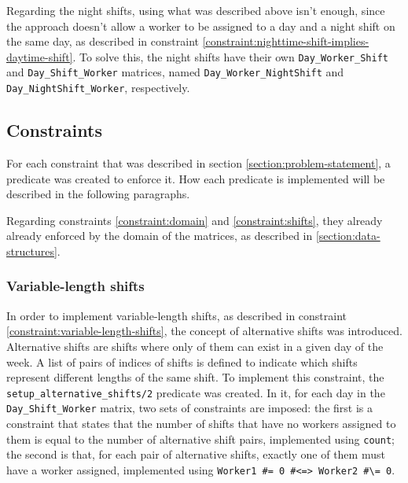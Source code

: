 \documentclass[conference]{IEEEtran}
\def\constraint#1{\vspace{4pt} {#1}}
\begin{document}
Regarding the night shifts, using what was described above isn't enough, since the approach doesn't allow a worker to be assigned to a day and a night shift on the same day, as described in constraint \ref{constraint:nighttime-shift-implies-daytime-shift}.
To solve this, the night shifts have their own \texttt{Day\_Worker\_Shift} and \texttt{Day\_Shift\_Worker} matrices, named \texttt{Day\_Worker\_NightShift} and \texttt{Day\_NightShift\_Worker}, respectively.

\subsection{Constraints}
\label{section:constraints}

For each constraint that was described in section \ref{section:problem-statement}, a predicate was created to enforce it. How each predicate is implemented will be described in the following paragraphs.

Regarding constraints \ref{constraint:domain} and \ref{constraint:shifts}, they already already enforced by the domain of the matrices, as described in \ref{section:data-structures}.

\constraint {
    \subsubsection*{Variable-length shifts}
    In order to implement variable-length shifts, as described in constraint \ref{constraint:variable-length-shifts}, the concept of alternative shifts was introduced. Alternative shifts are shifts where only of them can exist in a given day of the week. A list of pairs of indices of shifts is defined to indicate which shifts represent different lengths of the same shift.
    To implement this constraint, the \texttt{setup\_alternative\_shifts/2} predicate was created. In it, for each day in the \texttt{Day\_Shift\_Worker} matrix, two sets of constraints are imposed: the first is a constraint that states that the number of shifts that have no workers assigned to them is equal to the number of alternative shift pairs, implemented using \texttt{count}; the second is that, for each pair of alternative shifts, exactly one of them must have a worker assigned, implemented using \texttt{Worker1 \#= 0 \#<=> Worker2 \#\textbackslash= 0}.
}
\end{document}

